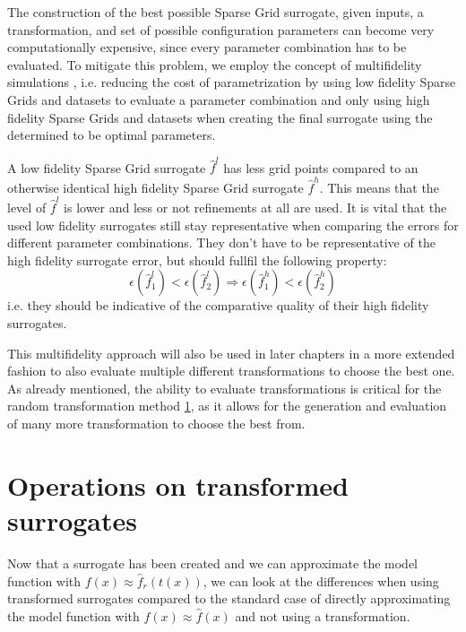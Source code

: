 \documentclass[
  a4paper,  %
  twoside,  %
  bibliography=totoc,
  headsepline,
  cleardoublepage=empty,
  parskip=half,
  draft=false
]{scrbook}
\begin{document}
The construction of the best possible Sparse Grid surrogate, given inputs, a transformation, and set of possible configuration parameters can become very computationally expensive, since every parameter combination has to be evaluated.
To mitigate this problem, we employ the concept of multifidelity simulations \cite{}, i.e. reducing the cost of parametrization by using low fidelity Sparse Grids and datasets to evaluate a parameter combination and only using high fidelity Sparse Grids and datasets when creating the final surrogate using the determined to be optimal parameters.

A low fidelity Sparse Grid surrogate $\hat{f}^l$ has less grid points compared to an otherwise identical high fidelity Sparse Grid surrogate $\hat{f}^h$.
This means that the level of $\hat{f}^l$ is lower and less or not refinements at all are used.
It is vital that the used low fidelity surrogates still stay representative when comparing the errors for different parameter combinations.
They don't have to be representative of the high fidelity surrogate error, but should fullfil the following property:
\begin{equation}
\epsilon(\hat{f}_1^l) < \epsilon(\hat{f}_2^l) \Rightarrow \epsilon(\hat{f}_1^h) < \epsilon(\hat{f}_2^h)
\end{equation}
i.e. they should be indicative of the comparative quality of their high fidelity surrogates.

This multifidelity approach will also be used in later chapters in a more extended fashion to also evaluate multiple different transformations to choose the best one.
As already mentioned, the ability to evaluate transformations is critical for the random transformation method \ref{}, as it allows for the generation and evaluation of many more transformation to choose the best from.

\section{Operations on transformed surrogates}

Now that a surrogate has been created and we can approximate the model function with $f(x) \approx \hat{f}_r(t(x))$,
we can look at the differences when using transformed surrogates compared to the standard case of directly approximating the model function with $f(x) \approx \hat{f}(x)$ and not using a transformation.
\end{document}
